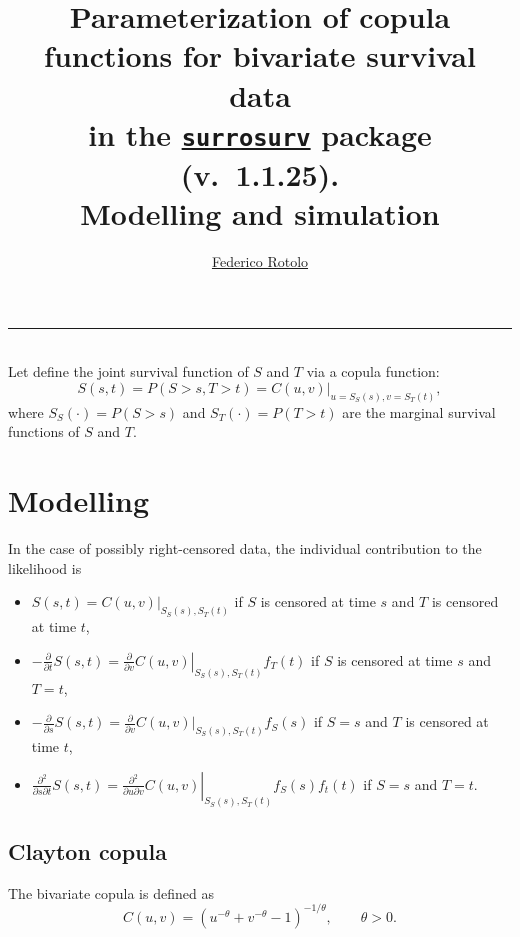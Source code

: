 \documentclass{article}
\title{Parameterization of copula functions for bivariate survival data \\
  in the \href{https://cran.r-project.org/package=surrosurv}{\texttt{surrosurv}} package (v.~1.1.25).\\
  Modelling and simulation}
\author{\href{mailto:Federico Rotolo <federico.rotolo@gustaveroussy.fr>
?Subject=R:::surrosurv}{Federico Rotolo}}
\begin{document}

\maketitle
\hrule~\\[1em]

Let define the joint survival function of $S$ and $T$
    via a copula function:
    \begin{equation}
    S(s, t) = P(S> s, T> t) = \left.C(u,v)\right|_{u = S_S(s), v = S_T(t)},
    \end{equation}
    where $S_S(\cdot)=P(S> s)$ and $S_T(\cdot)=P(T> t)$
    are the marginal survival functions of $S$ and $T$.

\section*{Modelling}
In the case of possibly right-censored data,
    the individual contribution to the likelihood is
\begin{itemize}
\item $S(s, t) = \left.C(u,v)\right|_{S_S(s), S_T(t)}$
    if $S$ is censored at time $s$ and $T$ is censored at time $t$,
\item $-\frac{\partial}{\partial t}S(s, t) = 
    \left.\frac{\partial}{\partial v} C(u,v)\right|_{S_S(s), S_T(t)} f_T(t)$
    if $S$ is censored at time $s$ and $T=t$,
\item $-\frac{\partial}{\partial s}S(s, t) =
    \frac{\partial}{\partial v}\left.C(u,v)\right|_{S_S(s), S_T(t)} f_S(s)$
    if $S=s$ and $T$ is censored at time $t$,
\item $\frac{\partial^2}{\partial s \partial t}S(s, t) = 
    \left.\frac{\partial^2}{\partial u \partial v}C(u,v)\right|_{S_S(s), S_T(t)}
    f_S(s)f_t(t)$ if $S=s$ and $T=t$.
\end{itemize}


\subsection*{Clayton copula}
The bivariate \cite{Clayton78} copula is defined as
\begin{equation}
    C(u,v)= \left(
        u^{-\theta} + v^{-\theta} - 1
        \right)^{-1/\theta}, \qquad \theta > 0.
\end{equation}
\end{document}
